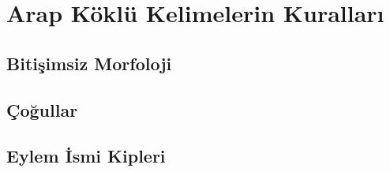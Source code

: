
\chapter{Arap Köklü Kelimelerin Kuralları}
\section{Bitişimsiz Morfoloji}

\section{Çoğullar}

\section{Eylem İsmi Kipleri}



